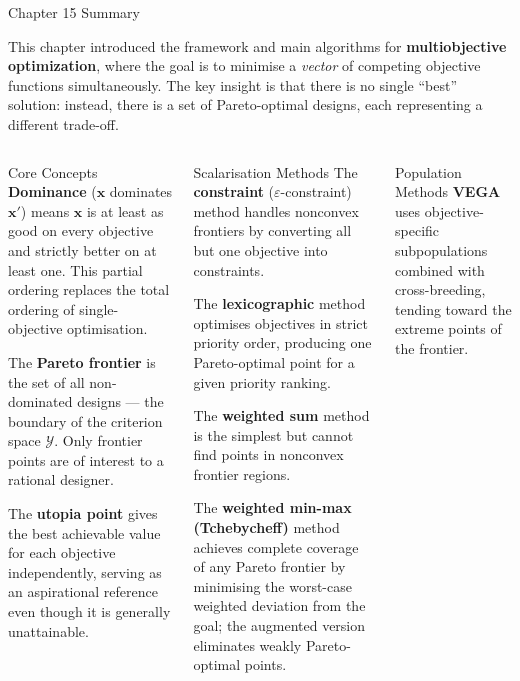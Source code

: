 \documentclass[aspectratio=169,10pt]{beamer}
\newcommand{\bx}{\mathbf{x}}
\begin{document}
\begin{frame}[allowframebreaks]{Chapter 15 Summary}

This chapter introduced the framework and main algorithms for
\textbf{multiobjective optimization}, where the goal is to minimise a
\emph{vector} of competing objective functions simultaneously.  The key
insight is that there is no single ``best'' solution: instead, there is a
set of Pareto-optimal designs, each representing a different trade-off.

\begin{columns}
\begin{block}{Core Concepts}
  \textbf{Dominance} ($\bx$ dominates $\bx'$) means $\bx$ is at least as
  good on every objective and strictly better on at least one.  This partial
  ordering replaces the total ordering of single-objective optimisation.

  The \textbf{Pareto frontier} is the set of all non-dominated designs --- the
  boundary of the criterion space $\mathcal{Y}$.  Only frontier points are
  of interest to a rational designer.

  The \textbf{utopia point} gives the best achievable value for each objective
  independently, serving as an aspirational reference even though it is
  generally unattainable.
\end{block}

\begin{block}{Scalarisation Methods}
  The \textbf{constraint} ($\varepsilon$-constraint) method handles nonconvex
  frontiers by converting all but one objective into constraints.

  The \textbf{lexicographic} method optimises objectives in strict priority
  order, producing one Pareto-optimal point for a given priority ranking.

  The \textbf{weighted sum} method is the simplest but cannot find points in
  nonconvex frontier regions.

  The \textbf{weighted min-max (Tchebycheff)} method achieves complete
  coverage of any Pareto frontier by minimising the worst-case weighted
  deviation from the goal; the augmented version eliminates weakly
  Pareto-optimal points.
\end{block}

\begin{block}{Population Methods}
  \textbf{VEGA} uses objective-specific subpopulations combined with
  cross-breeding, tending toward the extreme points of the frontier.


\end{block}
\end{columns}
\end{frame}
\end{document}
